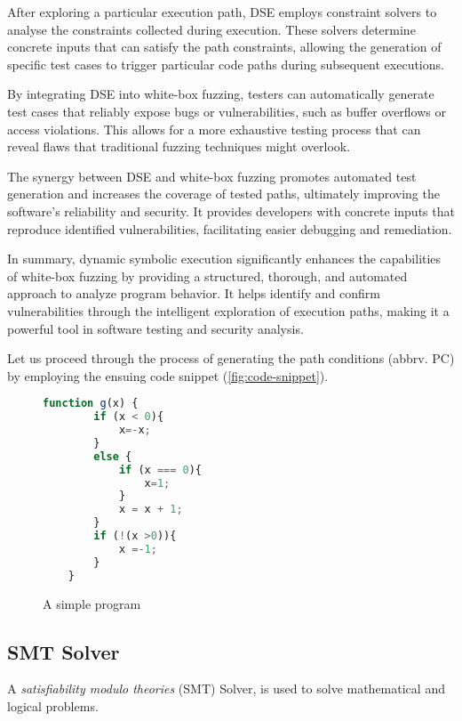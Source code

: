 After exploring a particular execution path, DSE employs constraint solvers to analyse the constraints collected during execution. These solvers determine concrete inputs that can satisfy the path constraints, allowing the generation of specific test cases to trigger particular code paths during subsequent executions.

By integrating DSE into white-box fuzzing, testers can automatically generate test cases that reliably expose bugs or vulnerabilities, such as buffer overflows or access violations. This allows for a more exhaustive testing process that can reveal flaws that traditional fuzzing techniques might overlook.

The synergy between DSE and white-box fuzzing promotes automated test generation and increases the coverage of tested paths, ultimately improving the software's reliability and security. It provides developers with concrete inputs that reproduce identified vulnerabilities, facilitating easier debugging and remediation.

In summary, dynamic symbolic execution significantly enhances the capabilities of white-box fuzzing by providing a structured, thorough, and automated approach to analyze program behavior. It helps identify and confirm vulnerabilities through the intelligent exploration of execution paths, making it a powerful tool in software testing and security analysis.

Let us proceed through the process of generating the path conditions (abbrv. PC) by employing the ensuing code snippet (\autoref{fig:code-snippet}). 
\begin{figure}[ht]
    \begin{lstlisting}[language=JavaScript, gobble=4, escapechar=@]
    function g(x) {
        if (x < 0){
            x=-x;
        }
        else {
            if (x === 0){
                x=1;
            }
            x = x + 1;
        }
        if (!(x >0)){
            x =-1;
        }
    }
    \end{lstlisting}
    \caption{A simple program}
    \label{fig:code-snippet}
\end{figure}


\subsection{SMT Solver}
\label{sec:smtsolver}

A \textit{satisfiability modulo theories }(SMT) Solver, is used to solve mathematical and logical problems. 

